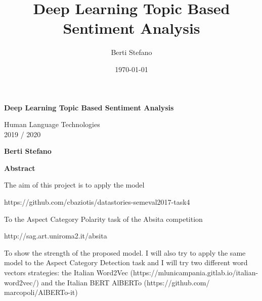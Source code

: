 \documentclass{article}
\title{Deep Learning Topic Based Sentiment Analysis}
\author{Berti Stefano}
\date{\today}
\begin{document}
    \thispagestyle{plain}
    \begin{center}
        \Large
        \textbf{Deep Learning Topic Based Sentiment Analysis}

        \vspace{0.4cm}
        \large Human Language Technologies
        \\2019 / 2020

        \vspace{0.4cm}
        \textbf{Berti Stefano}

        \vspace{0.9cm}
        \textbf{Abstract}
    \end{center}
    The aim of this project is to apply the model
    \\\centerline{https://github.com/cbaziotis/datastories-semeval2017-task4}
    To the Aspect Category Polarity task of the Absita competition
    \\\centerline{http://sag.art.uniroma2.it/absita}
    To show the strength of the proposed model.
    I will also try to apply the same model to the Aspect Category Detection task and I will try two different word
    vectors strategies: the Italian Word2Vec (https://mlunicampania.gitlab.io/italian-word2vec/) and the Italian BERT
    AlBERTo (https://github.com/ marcopoli/AlBERTo-it)
\end{document}
